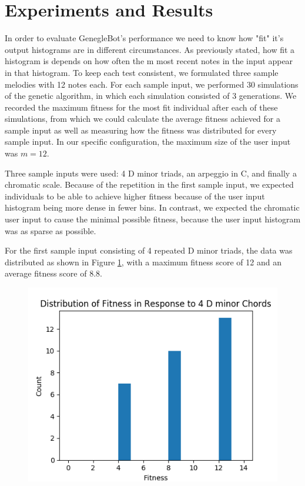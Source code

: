 \documentclass[conference]{IEEEtran}
\begin{document}
\section{Experiments and Results}

    In order to evaluate GenegleBot's performance we need to know how "fit" it's output histograms are in different circumstances.  As previously stated, how fit a histogram is depends on how often the m most recent notes in the input appear in that histogram.  To keep each test consistent, we formulated three sample melodies with 12 notes each.  For each sample input, we performed 30 simulations of the genetic algorithm, in which each simulation consisted of 3 generations. We recorded the maximum fitness for the most fit individual after each of these simulations, from which we could calculate the average fitness achieved for a sample input as well as measuring how the fitness was distributed for every sample input. In our specific configuration, the maximum size of the user input was $ m=12 $. 
    
Three sample inputs were used: 4 D minor triads, an arpeggio in C, and finally a chromatic scale. Because of the repetition in the first sample input, we expected individuals to be able to achieve higher fitness because of the user input histogram being more dense in fewer bins. In contrast, we expected the chromatic user input to cause the minimal possible fitness, because the user input histogram was as sparse as possible. 

For the first sample input consisting of 4 repeated D minor triads, the data was distributed as shown in Figure \ref{fig:dminordist}, with a maximum fitness score of 12 and an average fitness score of 8.8. 


\begin{figure}[H]
	\centering
	\includegraphics[width=0.8\linewidth]{dMinorDist}
	\caption{}
	\label{fig:dminordist}
\end{figure}
\end{document}
